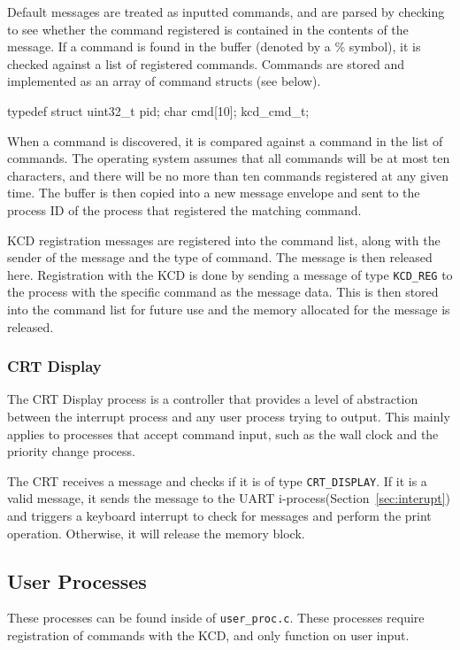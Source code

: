 \documentclass[se]{uw-wkrpt}
\begin{document}
Default messages are treated as inputted commands, and are parsed by checking to see whether the command registered is contained in the contents of the message. If a command is found in the buffer (denoted by a \% symbol), it is checked against a list of registered commands. Commands are stored and implemented as an array of command structs (see below).
\begin{code}
typedef struct {
    uint32_t pid;
    char cmd[10];
} kcd_cmd_t;
\end{code}

When a command is discovered, it is compared against a command in the list of commands. The operating system assumes that all commands will be at most ten characters, and there will be no more than ten commands registered at any given time. The buffer is then copied into a new message envelope and sent to the process ID of the process that registered the matching command.

KCD registration messages are registered into the command list, along with the sender of the message and the type of command. The message is then released here. Registration with the KCD is done by sending a message of type \texttt{KCD\_REG} to the process with the specific command as the message data. This is then stored into the command list for future use and the memory allocated for the message is released.


\subsubsection{CRT Display}

The CRT Display process is a controller that provides a level of abstraction between the interrupt process and any user process trying to output. This mainly applies to processes that accept command input, such as the wall clock and the priority change process. 

The CRT receives a message and checks if it is of type \texttt{CRT\_DISPLAY}. If it is a valid message, it sends the message to the UART i-process(Section~\ref{sec:interupt}) and triggers a keyboard interrupt to check for messages and perform the print operation. Otherwise, it will release the memory block.

\subsection{User Processes}

These processes can be found inside of \texttt{user\_proc.c}. These processes require registration of commands with the KCD, and only function on user input.
\end{document}
